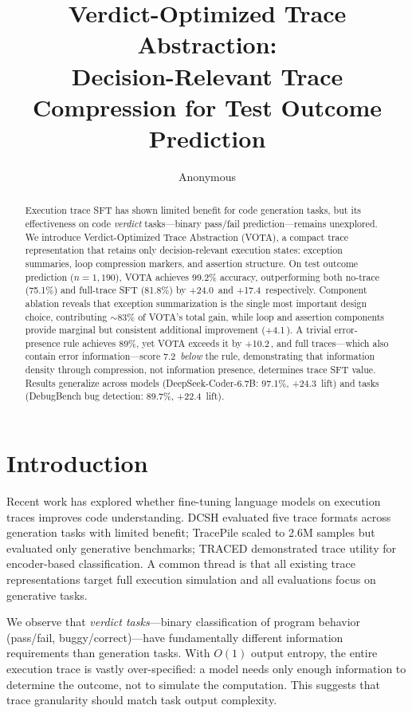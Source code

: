\documentclass[11pt]{article}
\title{Verdict-Optimized Trace Abstraction: \\
Decision-Relevant Trace Compression for Test Outcome Prediction}
\author{Anonymous}
\date{}
\newcommand{\vota}{\textsc{VOTA}}
\newcommand{\pp}{\,\text{pp}}
\begin{document}
\maketitle

\begin{abstract}
Execution trace SFT has shown limited benefit for code generation tasks, but its effectiveness on code \emph{verdict} tasks---binary pass/fail prediction---remains unexplored. We introduce Verdict-Optimized Trace Abstraction (\vota{}), a compact trace representation that retains only decision-relevant execution states: exception summaries, loop compression markers, and assertion structure. On test outcome prediction ($n{=}1{,}190$), \vota{} achieves 99.2\% accuracy, outperforming both no-trace (75.1\%) and full-trace SFT (81.8\%) by +24.0\pp{} and +17.4\pp{} respectively. Component ablation reveals that exception summarization is the single most important design choice, contributing ${\sim}83\%$ of \vota{}'s total gain, while loop and assertion components provide marginal but consistent additional improvement (+4.1\pp{}). A trivial error-presence rule achieves 89\%, yet \vota{} exceeds it by +10.2\pp{}, and full traces---which also contain error information---score 7.2\pp{} \emph{below} the rule, demonstrating that information density through compression, not information presence, determines trace SFT value. Results generalize across models (DeepSeek-Coder-6.7B: 97.1\%, +24.3\pp{} lift) and tasks (DebugBench bug detection: 89.7\%, +22.4\pp{} lift).
\end{abstract}

\section{Introduction}

Recent work has explored whether fine-tuning language models on execution traces improves code understanding. DCSH \cite{dcsh2025} evaluated five trace formats across generation tasks with limited benefit; TracePile \cite{tracepile2025} scaled to 2.6M samples but evaluated only generative benchmarks; TRACED \cite{traced2024} demonstrated trace utility for encoder-based classification. A common thread is that all existing trace representations target full execution simulation and all evaluations focus on generative tasks.

We observe that \emph{verdict tasks}---binary classification of program behavior (pass/fail, buggy/correct)---have fundamentally different information requirements than generation tasks. With $O(1)$ output entropy, the entire execution trace is vastly over-specified: a model needs only enough information to determine the outcome, not to simulate the computation. This suggests that trace granularity should match task output complexity.
\end{document}
